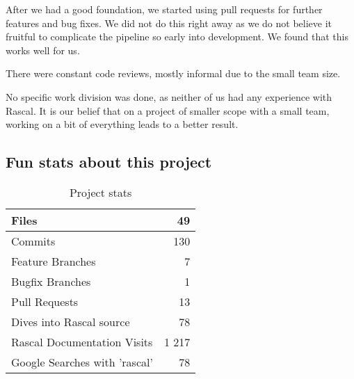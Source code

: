 \documentclass{article}
\begin{document}
After we had a good foundation, we started using pull requests for further features and bug fixes. We did not do this right away as we do not believe it fruitful to complicate the pipeline so early into development. We found that this works well for us.

There were constant code reviews, mostly informal due to the small team size.

No specific work division was done, as neither of us had any experience with Rascal. It is our belief that on a project of smaller scope with a small team, working on a bit of everything leads to a better result.

\subsection{Fun stats about this project}

\begin{table}[!htb]
\caption{Project stats}
\begin{tabular}{l|r}	
		\hline
		Files										&			49 \\
		\hline
		Commits										&			130 \\
		\hline
		Feature Branches							&			7 \\
		\hline
		Bugfix Branches								&			1 \\
		\hline	
		Pull Requests								&			13 \\
		\hline	
		Dives into Rascal source					&			78 \\
		\hline		
		Rascal Documentation Visits					&			1 217 \\ %
		\hline		
		Google Searches with 'rascal'				&			78 \\	%
		\hline		
\end{tabular}
\end{table}
\end{document}
